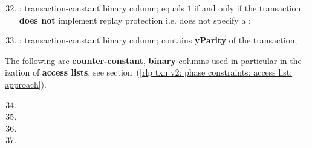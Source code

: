\begin{enumerate}
	\setcounter{enumi}{31}
    \item 
	\rlpTxnCommonColumnReplayProtection{}:
	transaction-constant binary column;
	equals $1$ if and only if the transaction \textbf{does not} implement replay protection i.e.
	does not specify a \chainId{};
    \item
	\rlpTxnCommonColumnYparity{}:
	transaction-constant binary column;
	contains \textbf{yParity} of the transaction;
\end{enumerate}
The following are \textbf{counter-constant}, \textbf{binary} columns used in particular in the \rlp{}-ization of \textbf{access lists},
see section~(\ref{rlp txn v2: phase constraints: access list: approach}).
\begin{multicols}{2}
    \begin{enumerate}[resume]
	    \setcounter{enumi}{33}
	\item \rlpTxnSharedColumnIsPrefixOfAccessListItem
	\item \rlpTxnSharedColumnIsPrefixOfStorageKeyList
	\item \rlpTxnSharedColumnIsAccessListAddress
	\item \rlpTxnSharedColumnIsAccessListStorageKey
    \end{enumerate}
\end{multicols}
